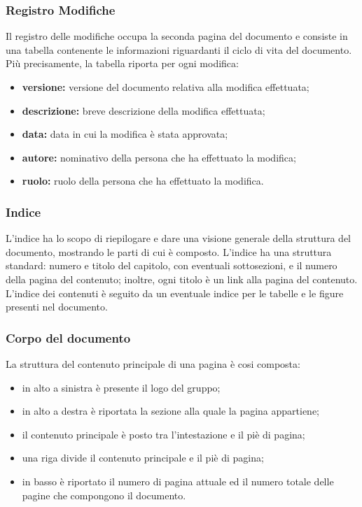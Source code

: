 \subsubsection{Registro Modifiche}\label{ProcessiDiSupportoDocumentazioneStrutturaGeneraleDeiDocumentiRegistroModifiche}
Il registro delle modifiche occupa la seconda pagina del documento e consiste in una tabella contenente le informazioni riguardanti il ciclo di vita del documento.
\\Più precisamente, la tabella riporta per ogni modifica:
\begin{itemize}
\item \textbf{versione:} versione del documento relativa alla modifica effettuata;
	\item \textbf{descrizione:} breve descrizione della modifica effettuata;
		\item \textbf{data:} data in cui la modifica è stata approvata;
			\item \textbf{autore:} nominativo della persona che ha effettuato la modifica;
				\item \textbf{ruolo:} ruolo della persona che ha effettuato la modifica.
\end{itemize}
\subsubsection{Indice}\label{ProcessiDiSupportoDocumentazioneStrutturaGeneraleDeiDocumentiIndice}
L'indice ha lo scopo di riepilogare e dare una visione generale della struttura del documento, mostrando le parti di cui è composto. L'indice ha una struttura standard: numero e titolo del capitolo, con eventuali sottosezioni, e il numero della pagina del contenuto; inoltre, ogni titolo è un link alla pagina del contenuto. L'indice dei contenuti è seguito da un eventuale indice per le tabelle e le figure presenti nel documento.
\subsubsection{Corpo del documento}\label{ProcessiDiSupportoDocumentazioneStrutturaGeneraleDeiDocumentiCorpoDelDocumento}
La struttura del contenuto principale di una pagina è cosi composta:
\begin{itemize}
\item in alto a sinistra è presente il logo del gruppo;
	\item in alto a destra è riportata la sezione alla quale la pagina appartiene;
		\item il contenuto principale è posto tra l'intestazione e il piè di pagina;
			\item una riga divide il contenuto principale e il piè di pagina;
				\item in basso è riportato il numero di pagina attuale ed il numero totale delle pagine che compongono il documento.
\end{itemize}
